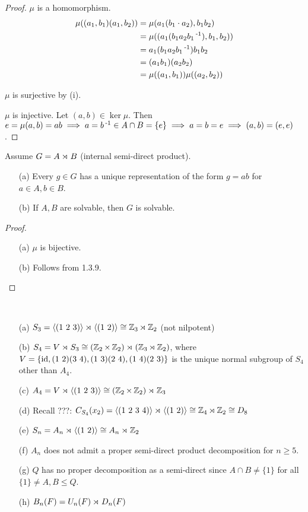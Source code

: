 \documentclass[11pt]{book}
\theoremstyle{definition}   \newtheorem{defn}[counter]{Definition} %
\newcommand{\hm}{homomorphism}   \newcommand{\hms}{homomorphisms}   \newcommand{\iso}{isomorphism}
\newcommand{\gen}[1]{\langle #1 \rangle}   \newcommand{\stab}[2]{\tn{Stab}_{#1}(#2)}   \newcommand{\fix}[2]{\tn{Fix}_{#1}(#2)}
\newcommand{\vs}{\vspace{8pt}}
\numberwithin{counter}{chapter}
\begin{document}
\begin{proof}
$\mu$ is a \hm.
	\begin{align*}
	\mu((a_1,b_1)(a_1,b_2)) &= \mu(a_1(b_1\cdot a_2), b_1 b_2) \\
	&= \mu((a_1(b_1a_2b_1\operatorname{^{-1}}),b_1,b_2)) \\
	&= a_1(b_1 a_2 b_1\operatorname{^{-1}}) b_1 b_2 \\
	&= (a_1b_1) (a_2 b_2) \\
	&= \mu((a_1,b_1)) \mu((a_2,b_2))
	\end{align*}

$\mu$ is surjective by (i).

$\mu$ is injective. Let $(a,b) \in \ker \mu$. Then $e = \mu(a,b) = ab \implies a = b\operatorname{^{-1}} \in A \cap B = \{e\} \implies a = b = e \implies (a,b) = (e,e)$.
\end{proof}

\vs

\begin{corollary}
Assume $G = A \rtimes_{} B$ (internal semi-direct product).
	\begin{enumerate}
	\item[(a)] Every $g \in G$ has a unique representation of the form $g = ab$ for $a \in A, b \in B$.
	\item[(b)] If $A,B$ are solvable, then $G$ is solvable.
	\end{enumerate}
\end{corollary}

\begin{proof}\
\begin{enumerate}
\item[(a)] $\mu$ is bijective.
\item[(b)] Follows from 1.3.9.
\end{enumerate}
\end{proof}

\vs

\begin{example}
\
\begin{enumerate}
\item[(a)] $S_3 = \gen{(1\ 2\ 3)} \sd{} \gen{(1\ 2)} \cong \z_3 \sd{} \z_2$ (not nilpotent)
\item[(b)] $S_4 = V \rtimes_{} S_3 \cong (\operatorname{\mathbb{Z}}_2 \times \operatorname{\mathbb{Z}}_2) \rtimes_{} (\operatorname{\mathbb{Z}}_3 \rtimes_{} \operatorname{\mathbb{Z}}_2)$, where $V = \{\id,(1\ 2)(3\ 4),(1\ 3)(2\ 4),(1\ 4)(2\ 3)\}$ is the unique normal subgroup of $S_4$ other than $A_4$.
\item[(c)] $A_4 = V \sd{} \gen{(1\ 2\ 3)} \cong (\z_2 \times \z_2) \sd{} \z_3$
\item[(d)] Recall ???: $C_{S_4}(x_2) = \gen{(1\ 2\ 3\ 4)} \sd{} \gen{(1\ 2)} \cong \z_4 \sd{} \z_2 \cong D_8$
\item[(e)] $S_n = A_n \sd{} \gen{(1\ 2)} \cong A_n \sd{} \z_2$
\item[(f)] $A_n$ does not admit a proper semi-direct product decomposition for $n \geq 5$.
\item[(g)] $Q$ has no proper decomposition as a semi-direct since $A \cap B \ne \{1\}$ for all $\{1\} \ne A,B \leq Q$.
\item[(h)] $B_n(F) = U_n(F) \rtimes_{} D_n(F)$
\end{enumerate}
\end{example}
\end{document}

